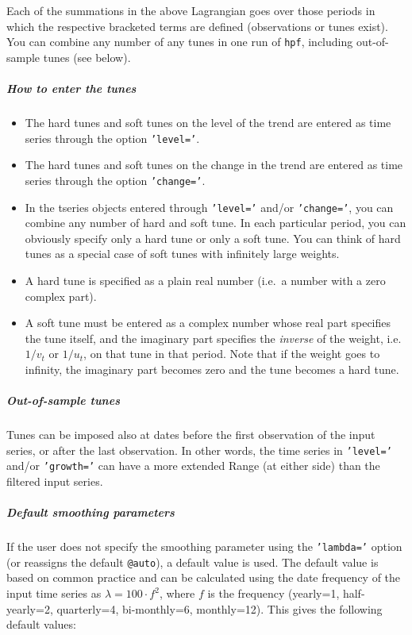 Each of the summations in the above Lagrangian goes over those periods
in which the respective bracketed terms are defined (observations or
tunes exist). You can combine any number of any tunes in one run of
\texttt{hpf}, including out-of-sample tunes (see below).

\subparagraph{How to enter the tunes}

\begin{itemize}
\item
  The hard tunes and soft tunes on the level of the trend are entered as
  time series through the option \texttt{'level='}.
\item
  The hard tunes and soft tunes on the change in the trend are entered
  as time series through the option \texttt{'change='}.
\item
  In the tseries objects entered through \texttt{'level='} and/or
  \texttt{'change='}, you can combine any number of hard and soft tune.
  In each particular period, you can obviously specify only a hard tune
  or only a soft tune. You can think of hard tunes as a special case of
  soft tunes with infinitely large weights.
\item
  A hard tune is specified as a plain real number (i.e.~a number with a
  zero complex part).
\item
  A soft tune must be entered as a complex number whose real part
  specifies the tune itself, and the imaginary part specifies the
  \emph{inverse} of the weight, i.e. $1/v_t$ or $1/u_t$, on that tune in
  that period. Note that if the weight goes to infinity, the imaginary
  part becomes zero and the tune becomes a hard tune.
\end{itemize}

\subparagraph{Out-of-sample tunes}

Tunes can be imposed also at dates before the first observation of the
input series, or after the last observation. In other words, the time
series in \texttt{'level='} and/or \texttt{'growth='} can have a more
extended Range (at either side) than the filtered input series.

\subparagraph{Default smoothing
parameters}

If the user does not specify the smoothing parameter using the
\texttt{'lambda='} option (or reassigns the default \texttt{@auto}), a
default value is used. The default value is based on common practice and
can be calculated using the date frequency of the input time series as
$\lambda = 100 \cdot f^2$, where $f$ is the frequency (yearly=1,
half-yearly=2, quarterly=4, bi-monthly=6, monthly=12). This gives the
following default values:

